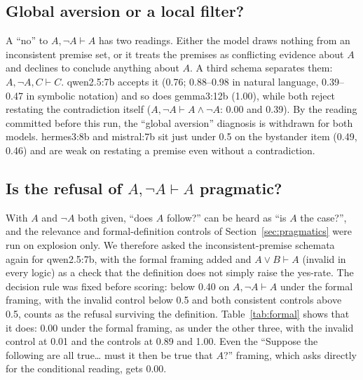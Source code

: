 \documentclass[11pt]{article}
\begin{document}
\subsection{Global aversion or a local filter?}\label{sec:inconsistent}
A ``no'' to $A, \neg A \vdash A$ has two readings. Either the model draws nothing from an inconsistent
premise set, or it treats the premises as conflicting evidence about $A$ and declines to conclude
anything about $A$. A third schema separates them: $A, \neg A, C \vdash C$. qwen2.5:7b accepts it (0.76;
0.88--0.98 in natural language, 0.39--0.47 in symbolic notation) and so does gemma3:12b (1.00), while both
reject restating the contradiction itself ($A, \neg A \vdash A \land \neg A$: 0.00 and 0.39). By the
reading committed before this run, the ``global aversion'' diagnosis is withdrawn for both models.
hermes3:8b and mistral:7b sit just under 0.5 on the bystander item (0.49, 0.46) and are weak on
restating a premise even without a contradiction.

\subsection{Is the refusal of $A, \neg A \vdash A$ pragmatic?}\label{sec:formal}
With $A$ and $\neg A$ both given, ``does $A$ follow?'' can be heard as ``is $A$ the case?'', and the
relevance and formal-definition controls of Section~\ref{sec:pragmatics} were run on explosion only. We
therefore asked the inconsistent-premise schemata again for qwen2.5:7b, with the formal framing added and
$A \lor B \vdash A$ (invalid in every logic) as a check that the definition does not simply raise the
yes-rate. The decision rule was fixed before scoring: below 0.40 on $A, \neg A \vdash A$ under the formal
framing, with the invalid control below 0.5 and both consistent controls above 0.5, counts as the refusal
surviving the definition. Table~\ref{tab:formal} shows that it does: 0.00 under the formal framing, as
under the other three, with the invalid control at 0.01 and the controls at 0.89 and 1.00. Even the
``Suppose the following are all true\ldots{} must it then be true that $A$?'' framing, which asks
directly for the conditional reading, gets 0.00.
\end{document}
